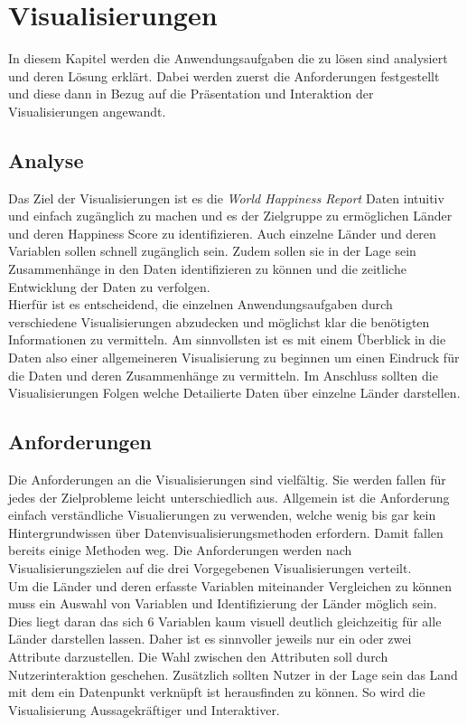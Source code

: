\section{Visualisierungen}
In diesem Kapitel werden die Anwendungsaufgaben die zu lösen sind analysiert und deren Lösung erklärt. Dabei werden zuerst die Anforderungen festgestellt und diese dann in Bezug auf die Präsentation und Interaktion der Visualisierungen angewandt.  

\subsection{Analyse}

Das Ziel der Visualisierungen ist es die \textit{World Happiness Report} Daten intuitiv und einfach zugänglich zu machen und es der Zielgruppe zu ermöglichen Länder und deren Happiness Score zu identifizieren. Auch einzelne Länder und deren Variablen sollen schnell zugänglich sein. Zudem sollen sie in der Lage sein Zusammenhänge in den Daten identifizieren zu können und die zeitliche Entwicklung der Daten zu verfolgen. \\

Hierfür ist es entscheidend, die einzelnen Anwendungsaufgaben durch verschiedene Visualisierungen abzudecken und möglichst klar die benötigten Informationen zu vermitteln.
Am sinnvollsten ist es mit einem Überblick in die Daten also einer allgemeineren Visualisierung zu beginnen um einen Eindruck für die Daten und deren Zusammenhänge zu vermitteln. Im Anschluss sollten die Visualisierungen Folgen welche Detailierte Daten über einzelne Länder darstellen. \\

\subsection{Anforderungen}
Die Anforderungen an die Visualisierungen sind vielfältig. Sie werden fallen für jedes der Zielprobleme leicht unterschiedlich aus. Allgemein ist die Anforderung einfach verständliche Visualierungen zu verwenden, welche wenig bis gar kein Hintergrundwissen über Datenvisualisierungsmethoden erfordern. Damit fallen bereits einige Methoden weg. Die Anforderungen werden nach Visualisierungszielen auf die drei Vorgegebenen Visualisierungen verteilt.\\

Um die Länder und deren erfasste Variablen miteinander Vergleichen zu können muss ein Auswahl von Variablen und Identifizierung der Länder möglich sein. Dies liegt daran das sich 6 Variablen kaum visuell deutlich gleichzeitig für alle Länder darstellen lassen. Daher ist es sinnvoller jeweils nur ein oder zwei Attribute darzustellen. Die Wahl zwischen den Attributen soll durch Nutzerinteraktion geschehen. Zusätzlich sollten Nutzer in der Lage sein das Land mit dem ein Datenpunkt verknüpft ist herausfinden zu können. So wird die Visualisierung Aussagekräftiger und Interaktiver.\\

